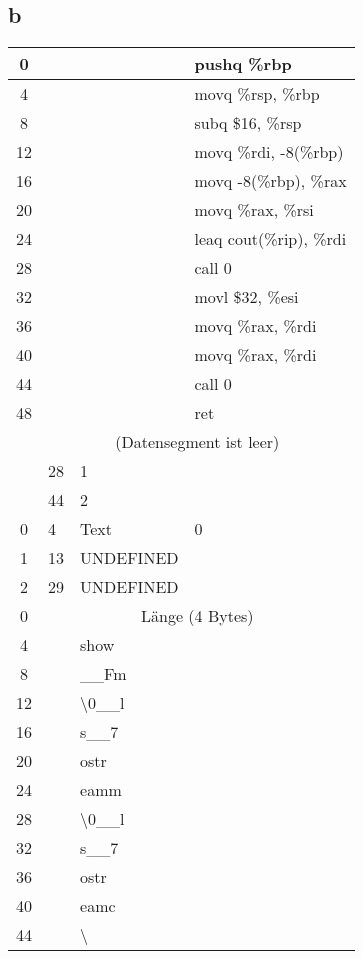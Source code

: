 \documentclass{ti2}
\begin{document}
\subsection{b}
\begin{tabular}{|c|l l l|}
	\hline
	0 & & & pushq	\%rbp\\
	\hline
	4 & & & movq	\%rsp, \%rbp\\
	\hline
	8 & & & subq	\$16, \%rsp\\
	\hline
	12 & & & movq	\%rdi, -8(\%rbp)\\
	\hline
	16 & & & movq	-8(\%rbp), \%rax\\
	\hline
	20 & & & movq	\%rax, \%rsi\\
	\hline
	24 & & & leaq	cout(\%rip), \%rdi\\
	\hline
	28 & & & call	0\\
	\hline
	32 & & & movl	\$32, \%esi\\
	\hline
	36 & & & movq	\%rax, \%rdi\\
	\hline
	40 & & & movq	\%rax, \%rdi\\
	\hline
	44 & & & call	0\\
	\hline
	48 & & & ret\\
	\hline
	& \multicolumn{3}{|c|}{(Datensegment ist leer)} \\
	\hline
	& 28 & 1 & \\
	\hline
	& 44 & 2 & \\
	\hline
	0 & 4 & Text & 0 \\
	\hline
	1 & 13 & UNDEFINED &  \\
	\hline
	2 & 29 & UNDEFINED &  \\
	\hline
	0 & \multicolumn{3}{|c|}{Länge (4 Bytes)} \\
	\hline
	4 &  & show &  \\
	\hline
	8 & & \_\_Fm & \\
	\hline
	12 & & \textbackslash0\_\_l & \\
	\hline
	16 & & s\_\_7 & \\
	\hline
	20 & & ostr & \\
	\hline
	24 & & eamm & \\
	\hline
	28 & & \textbackslash0\_\_l & \\
	\hline
	32 & & s\_\_7 & \\
	\hline
	36 & & ostr & \\
	\hline
	40 & & eamc & \\
	\hline
	44 & & \textbackslash & \\
	\hline
\end{tabular}	
\end{document}
